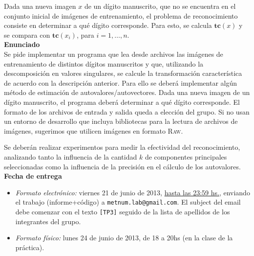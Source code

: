 Dada una nueva imagen $x$ de un d\'igito manuscrito, que no se encuentra en el conjunto inicial de im\'agenes de entrenamiento, el problema de reconocimiento consiste en determinar a qu\'e d\'igito corresponde. Para esto, se calcula $\mathbf{tc}(x)$ y se compara con $\mathbf{tc}(x_i)$, para $i = 1,\ldots, n$. \\

{\bf Enunciado}\\

Se pide implementar un programa que lea desde archivos las im\'agenes de entrenamiento de distintos d\'igitos manuscritos y que, utilizando la descomposici\'on en valores singulares, se calcule la transformaci\'on caracter\'istica de acuerdo con la descripci\'on anterior. Para ello se deber\'a implementar alg\'un m\'etodo de estimaci\'on de autovalores/autovectores. Dada una nueva imagen de un d\'igito manuscrito, el programa deber\'a determinar a qu\'e d\'igito co\-rres\-pon\-de.
El formato de los archivos de entrada y salida queda a elecci\'on del grupo. Si no usan un entorno de desarrollo que incluya bibliotecas para la lectura de archivos de im\'agenes, sugerimos que utilicen im\'agenes en formato \textsc{Raw}. 

Se deber\'an realizar experimentos para medir la efectividad del reconocimiento, analizando tanto la influencia de la cantidad $k$ de componentes principales seleccionadas como la influencia de la precisi\'on en el c\'alculo de los autovalores.\\

{\bf Fecha de entrega} 

\begin{itemize}
\item \textsl{Formato electr\'onico:} viernes 21 de junio de 2013, \underline{hasta las 23:59 hs.}, enviando el trabajo (informe+c\'odigo) a \texttt{metnum.lab@gmail.com}. El subject del email debe comenzar con el texto \verb|[TP3]| seguido de la lista de apellidos de los integrantes del grupo. 
\item \textsl{Formato f\'isico:} lunes 24 de junio de 2013, de 18 a 20hs (en la clase de la pr\'actica).
\end{itemize}